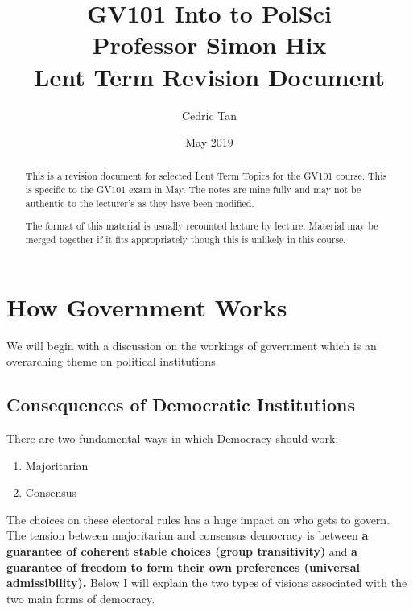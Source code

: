 \documentclass[12pt, letterpaper]{article}
\title{
	{GV101 Into to PolSci}\\
	{\large{Professor Simon Hix}}\\
	{\large{Lent Term Revision Document}}
}
\author{Cedric Tan}
\date{May 2019}
\begin{document}
\maketitle
\begin{abstract}

	This is a revision document for selected Lent Term Topics for the GV101 course. This is specific to the GV101 exam in May. The notes are mine fully and may not be authentic to the lecturer's as they have been modified.

	The format of this material is usually recounted lecture by lecture. Material may be merged together if it fits appropriately though this is unlikely in this course.

\end{abstract}
\newpage
\tableofcontents
\newpage

\section{How Government Works}
We will begin with a discussion on the workings of government which is an overarching theme on political institutions
\subsection{Consequences of Democratic Institutions}
There are two fundamental ways in which Democracy should work:
\begin{enumerate}
	\item Majoritarian
	\item Consensus
\end{enumerate}
The choices on these electoral rules has a huge impact on who gets to govern. The tension between majoritarian and consensus democracy is between \textbf{a guarantee of coherent stable choices (group transitivity)} and \textbf{a guarantee of freedom to form their own preferences (universal admissibility).} Below I will explain the two types of visions associated with the two main forms of democracy.
\end{document}
